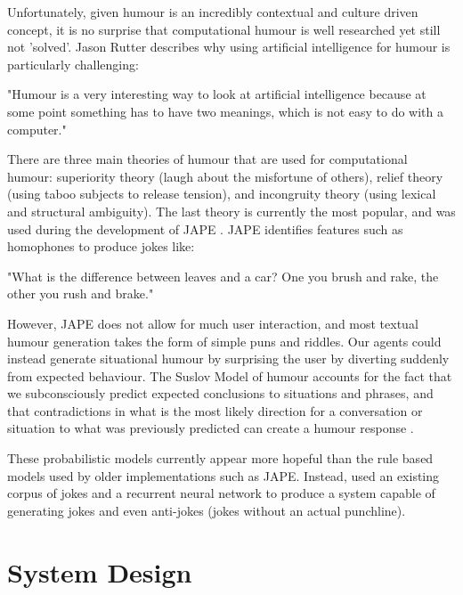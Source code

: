 \documentclass[conference]{IEEEtran}
\begin{document}
Unfortunately, given humour is an incredibly contextual and culture driven concept, it is no surprise that computational humour is well researched yet still not 'solved'. Jason Rutter describes why using artificial intelligence for humour is particularly challenging:

\begin{displayquote}
"Humour is a very interesting way to look at artificial intelligence because at some point something has to have two meanings, which is not easy to do with a computer." \cite{jasonrutter}
\end{displayquote}

There are three main theories of humour that are used for computational humour: superiority theory (laugh about the misfortune of others), relief theory (using taboo subjects to release tension), and incongruity theory (using lexical and structural ambiguity). The last theory is currently the most popular, and was used during the development of JAPE \cite{jape}. JAPE identifies features such as homophones to produce jokes like:

\begin{displayquote}
	"What is the difference between leaves and a car? One you brush and rake, the other you rush and brake."
\end{displayquote}

However, JAPE does not allow for much user interaction, and most textual humour generation takes the form of simple puns and riddles. Our agents could instead generate situational humour by surprising the user by diverting suddenly from expected behaviour. The Suslov Model of humour accounts for the fact that we subconsciously predict expected conclusions to situations and phrases, and that contradictions in what is the most likely direction for a conversation or situation to what was previously predicted can create a humour response \cite{suslov}.

These probabilistic models currently appear more hopeful than the rule based models used by older implementations such as JAPE. Instead, \cite{humourrnn} used an existing corpus of jokes and a recurrent neural network to produce a system capable of generating jokes and even anti-jokes (jokes without an actual punchline). 


\section{System Design}
\end{document}
